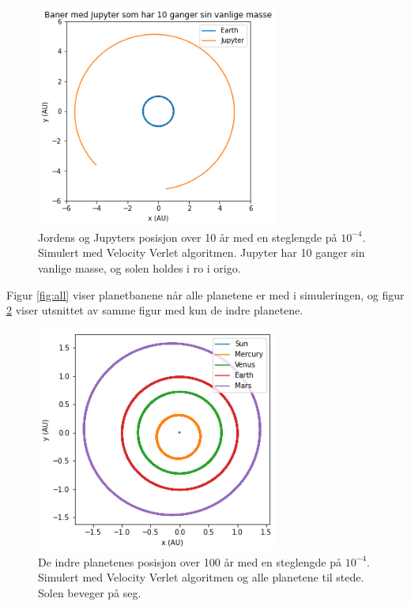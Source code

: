 \documentclass[reprint,english,notitlepage]{revtex4-1}
\begin{document}
	\begin{figure}[H]
		\includegraphics[width=80mm]{../Code/Figures/jstat10.png}
		\caption{Jordens og Jupyters posisjon over 10 år med en steglengde på $10^{-4}$. Simulert med Velocity Verlet algoritmen. Jupyter har 10 ganger sin vanlige masse, og solen holdes i ro i origo.}
		\label{fig:jstat10}
	\end{figure}

	Figur \ref{fig:all} viser planetbanene når alle planetene er med i simuleringen, og figur \ref{fig:inner} viser utsnittet av samme figur med kun de indre planetene.

	\begin{figure}[H]
		\includegraphics[width=80mm]{../Code/Figures/inner.png}
		\caption{De indre planetenes posisjon over 100 år med en steglengde på $10^{-4}$. Simulert med Velocity Verlet algoritmen og alle planetene til stede. Solen beveger på seg.}
		\label{fig:inner}
	\end{figure}
\end{document}
